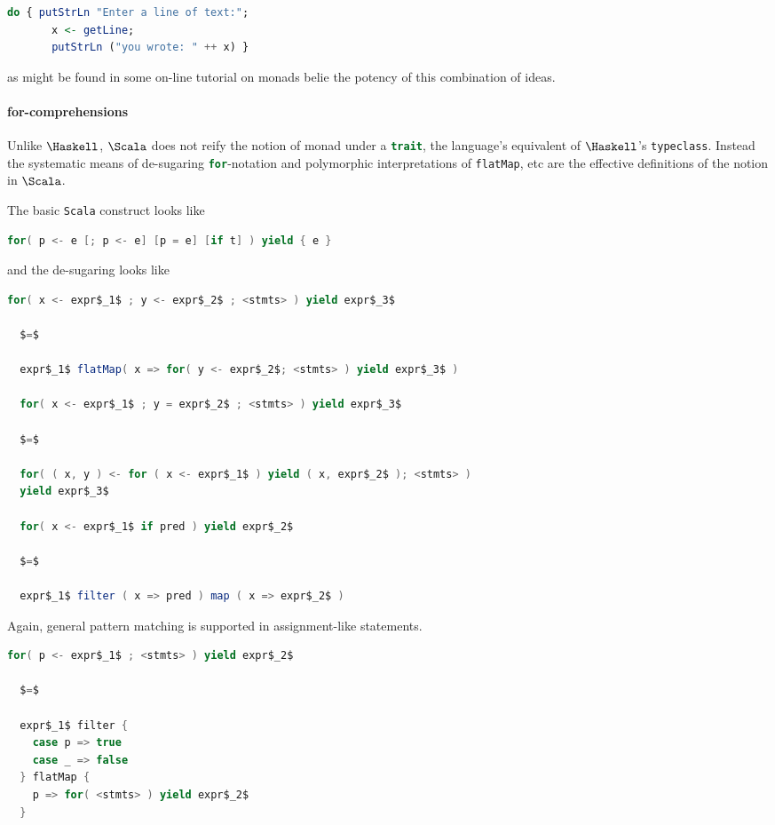\begin{lstlisting}[language=Haskell]
  do { putStrLn "Enter a line of text:";
       x <- getLine;
       putStrLn ("you wrote: " ++ x) }
\end{lstlisting}

as might be found in some on-line tutorial on monads belie the potency
of this combination of ideas.

\paragraph{for-comprehensions}
Unlike $\Haskell$, $\Scala$ does not reify the notion of monad under a
\lstinline[language=Scala]!trait!, the language's equivalent of
$\Haskell$'s \lstinline[language=Haskell]!typeclass!. Instead the
systematic means of de-sugaring
\lstinline[language=Scala]!for!-notation and polymorphic
interpretations of \lstinline[language=Scala]!flatMap!, etc are the
effective definitions of the notion in $\Scala$.

The basic \texttt{Scala} construct looks like

\begin{lstlisting}[language=Scala]
  for( p <- e [; p <- e] [p = e] [if t] ) yield { e }
\end{lstlisting}

and the de-sugaring looks like

\begin{lstlisting}[language=Scala,mathescape=true]
  for( x <- expr$_1$ ; y <- expr$_2$ ; <stmts> ) yield expr$_3$

  $=$

  expr$_1$ flatMap( x => for( y <- expr$_2$; <stmts> ) yield expr$_3$ )

  for( x <- expr$_1$ ; y = expr$_2$ ; <stmts> ) yield expr$_3$
  
  $=$

  for( ( x, y ) <- for ( x <- expr$_1$ ) yield ( x, expr$_2$ ); <stmts> )
  yield expr$_3$

  for( x <- expr$_1$ if pred ) yield expr$_2$ 

  $=$

  expr$_1$ filter ( x => pred ) map ( x => expr$_2$ )    
\end{lstlisting}

Again, general pattern matching is supported in assignment-like statements.

\begin{lstlisting}[language=Scala,mathescape=true]
  for( p <- expr$_1$ ; <stmts> ) yield expr$_2$ 

  $=$

  expr$_1$ filter {
    case p => true
    case _ => false
  } flatMap {
    p => for( <stmts> ) yield expr$_2$
  }
\end{lstlisting}

